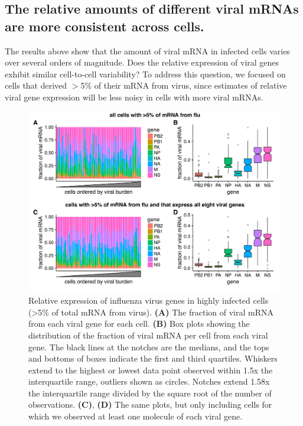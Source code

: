 \documentclass[9pt,lineno]{elife}
\begin{document}
\subsection{The relative amounts of different viral mRNAs are more consistent across cells.}
The results above show that the amount of viral mRNA in infected cells varies over several orders of magnitude.
Does the relative expression of viral genes exhibit similar cell-to-cell variability?
To address this question, we focused on cells that derived $>$5\% of their mRNA from virus, since estimates of relative viral gene expression will be less noisy in cells with more viral mRNAs.

\begin{figure}
\centerline{\includegraphics[width=0.9\linewidth]{figures/p_flu_expr_aledit.pdf}}
\caption{\label{fig:fluexpr}
Relative expression of influenza virus genes in highly infected cells (>5\% of total mRNA from virus).
{\bf (A)} 
The fraction of viral mRNA from each viral gene for each cell. 
{\bf (B)}
Box plots showing the distribution of the fraction of viral mRNA per cell from each viral gene.
The black lines at the notches are the medians, and the tops and bottoms of boxes indicate the first and third quartiles.
Whiskers extend to the highest or lowest data point observed within 1.5x the interquartile range, outliers shown as circles.
Notches extend 1.58x the interquartile range divided by the square root of the number of observations. 
{\bf (C)}, {\bf (D)} 
The same plots, but only including cells for which we observed at least one molecule of each viral gene.
}
\end{figure}
\end{document}
